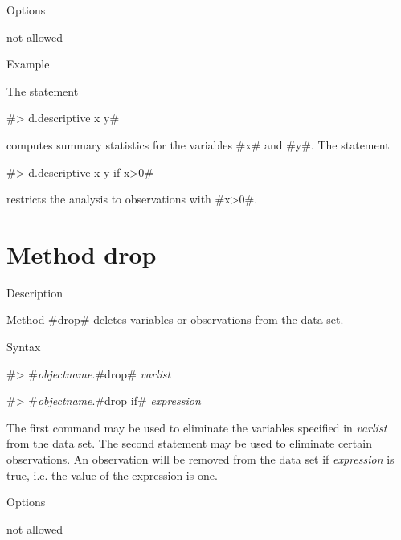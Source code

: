\begin{stanza}{Options}

{not allowed}
\end{stanza}


\begin{stanza}{Example}

{The statement

#> d.descriptive x y#

computes summary statistics for the variables #x# and #y#.
The statement

#> d.descriptive x y if x>0#

restricts the analysis to observations with #x>0#.}
\end{stanza}



\clearpage



\section{Method drop}
\label{drop}   


\begin{stanza}{Description}

{Method #drop# deletes variables or observations from the data set.}
\end{stanza}

\begin{stanza}{Syntax}

{#> #{\em objectname}.#drop# {\em varlist}

#> #{\em objectname}.#drop if# {\em expression}

The first command may be used to eliminate the variables specified
in {\em varlist} from the data set. The second statement may be
used to eliminate certain observations. An observation will be
removed from the data set if {\em expression} is true, i.e. the
value of the expression is one.}
\end{stanza}


\begin{stanza}{Options}

{not allowed}
\end{stanza}


